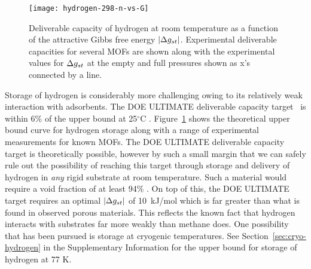 

\begin{figure}
    \centering
    \texttt{[image: hydrogen-298-n-vs-G]}
    \caption{Deliverable capacity of hydrogen at room temperature as a function of the attractive Gibbs free energy $|\Delta g_{st}|$.  Experimental deliverable capacities for several MOFs are shown along with the experimental values for $\Delta g_{st}$ at the empty and full pressures shown as x's connected by a line.}
    \label{fig:hydrogen-298-D}
\end{figure}



Storage of hydrogen is considerably more challenging owing to its relatively weak interaction with adsorbents. The DOE ULTIMATE deliverable capacity target~\cite{DOE} is within 6\% of the upper bound at 25$^\circ$C . Figure~\ref{fig:hydrogen-298-D} shows the theoretical upper bound curve for hydrogen storage along with a range of experimental measurements for known MOFs.  The DOE ULTIMATE deliverable capacity target is theoretically possible, however by such a small margin that we can safely rule out the possibility of reaching this target through storage and delivery of hydrogen in \emph{any} rigid substrate at room temperature. Such a material would require a void fraction of at least 94\% . On top of this, the DOE ULTIMATE target requires an optimal $|\Delta g_{st}|$ of 10~kJ/mol which is far greater than what is found in observed porous materials. This reflects the known fact that hydrogen interacts with substrates far more weakly than methane does. One possibility that has been pursued is storage at cryogenic temperatures. See Section~\ref{sec:cryo-hydrogen} in the Supplementary Information for the upper bound for storage of hydrogen at 77 K.

